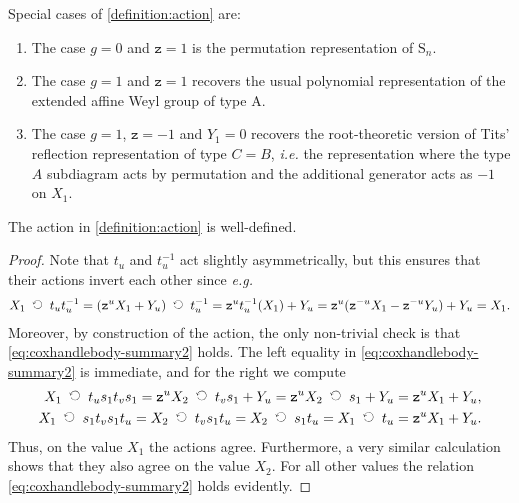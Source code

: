 \documentclass[a4paper,11pt]{amsart}
\newcommand{\ie}{\textsl{i.e.}}
\newcommand{\eg}{\textsl{e.g.}}
\newcommand{\actsright}{\mathop{\,\;\raisebox{0ex}{\rotatebox{90}{$\circlearrowleft$}}\;\,}}
\newcommand{\setstuff}[1]{\mathrm{#1}}
\newcommand{\varsym}[1]{\mathtt{#1}}
\newcommand{\zvar}{\varsym{z}}
\numberwithin{equation}{section}
\let\fullref\autoref
\begin{document}
\begin{remark}\label{remark:action}
Special cases of \fullref{definition:action} are:	
\begin{enumerate}

\item The case $g=0$ and $\zvar=1$ is the permutation 
representation of $\setstuff{S}_{n}$.

\item The case $g=1$ and $\zvar=1$ recovers the usual 
polynomial representation of the extended affine Weyl group of type A.

\item The case $g=1$, $\zvar=-1$ and $Y_{1}=0$ recovers 
the root-theoretic version of Tits' reflection representation 
of type $C=B$, {\ie} the representation where the type 
$A$ subdiagram acts by permutation and the 
additional generator acts as 
$-1$ on $X_{1}$.
\end{enumerate}
\end{remark}

\begin{lemma}\label{lemma:action}
The action in \fullref{definition:action} is well-defined.
\end{lemma}

\begin{proof}
Note that 
$t_{u}$ and $t_{u}^{-1}$ act slightly asymmetrically, 
but this ensures that their actions invert each other since {\eg}
\begin{gather*}
X_{1}\actsright t_{u}t_{u}^{-1}
=
(\zvar^{u}X_{1}+Y_{u})\actsright t_{u}^{-1}
=
\zvar^{u}t_{u}^{-1}(X_{1})+Y_{u}
=
\zvar^{u}(\zvar^{-u}X_{1}-\zvar^{-u}Y_{u})+Y_{u}
=
X_{1}.
\end{gather*}
Moreover, by construction of the action, the only 
non-trivial check is that 
\eqref{eq:coxhandlebody-summary2} holds.
The left equality in \eqref{eq:coxhandlebody-summary2} 
is immediate, and for the right we compute
\begin{gather*}
\begin{aligned}
X_{1}\actsright t_{u}s_{1}t_{v}s_{1}
=\zvar^{u}X_{2}\actsright t_{v}s_{1}+Y_{u}
=\zvar^{u}X_{2}\actsright s_{1}+Y_{u}
&=\zvar^{u}X_{1}+Y_{u},
\\
X_{1}\actsright s_{1}t_{v}s_{1}t_{u}=
X_{2}\actsright t_{v}s_{1}t_{u}
=X_{2}\actsright s_{1}t_{u}
=X_{1}\actsright t_{u}
&=\zvar^{u}X_{1}+Y_{u}.
\end{aligned}
\end{gather*}
Thus, on the value $X_{1}$ the actions agree. Furthermore, 
a very similar calculation 
shows that they also agree on the value $X_{2}$.
For all other values the relation \eqref{eq:coxhandlebody-summary2} 
holds evidently.
\end{proof}
\end{document}
